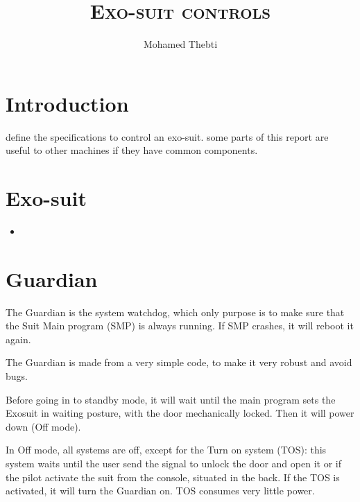 \documentclass[12pt,a4paper]{article}
\title{
	\Huge\textsc{Exo-suit controls}
}
\author{Mohamed Thebti}
\begin{document}
\setlength{\parindent}{0mm}

\fancyhead[R]{\slshape \leftmark}

\fancyfoot[C]{}
\fancyfoot[R]{\thepage}

\maketitle
\newpage

\tableofcontents

\newpage

\section{Introduction}

define the specifications to control an exo-suit.
some parts of this report are useful to other machines if they have common components. 

\section{Exo-suit}
\begin{itemize}
	\item 
\end{itemize}
\newpage

\section{Guardian}
The Guardian is the system watchdog, which only purpose is to make sure that the Suit Main program (SMP) is always running. If SMP crashes, it will reboot it again. 

The Guardian is made from a very simple code, to make it very robust and avoid bugs.

Before going in to standby mode, it will wait until the main program sets the Exosuit in waiting posture, with the door mechanically locked. Then it will power down (Off mode). 

In Off mode, all systems are off, except for the Turn on system (TOS): this system waits until the user send the signal to unlock the door and open it or if the pilot activate the suit from the console, situated in the back. If the TOS is activated, it will turn the Guardian on. TOS consumes very little power. 
\end{document}

